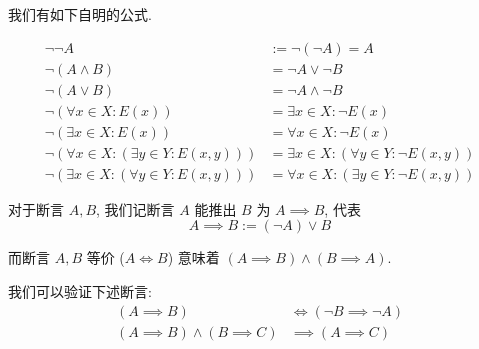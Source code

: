 我们有如下自明的公式.

\begin{theorem}
    \begin{align}
        \neg \neg A &:= \neg (\neg A) = A \\
        \neg (A \land B) &= \neg A \lor \neg B \\
        \neg (A \lor B) &= \neg A \land \neg B \\
        \neg (\forall x \in X : E(x)) &= \exists x \in X : \neg E(x) \\
        \neg (\exists x \in X : E(x)) &= \forall x \in X : \neg E(x) \\
        \neg (\forall x \in X : (\exists y \in Y : E(x, y))) &= \exists x \in X : (\forall y \in Y : \neg E(x, y)) \\
        \neg (\exists x \in X : (\forall y \in Y : E(x, y))) &= \forall x \in X : (\exists y \in Y : \neg E(x, y))
    \end{align}
\end{theorem}

\begin{definition}
    对于断言 \(A, B\), 我们记断言 \(A\) 能推出 \(B\) 为 \(A \implies B\), 代表
    \begin{equation}
        A \implies B := (\neg A) \lor B
    \end{equation}

    而断言 \(A, B\) 等价 (\(A \iff B\)) 意味着 \((A \implies B) \land (B \implies A)\).
\end{definition}

\begin{theorem}
    我们可以验证下述断言:
    \begin{align}
        (A \implies B) &\iff (\neg B \implies \neg A) \\
        (A \implies B) \land (B \implies C) &\implies (A \implies C)
    \end{align}
\end{theorem}
